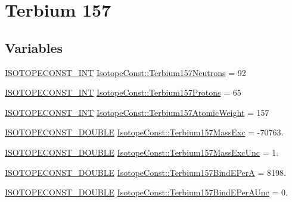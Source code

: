 \hypertarget{group___isotope_const-_terbium-_tb157}{}\section{Terbium 157}
\label{group___isotope_const-_terbium-_tb157}
\subsection*{Variables}
\begin{DoxyCompactItemize}
\item 
\mbox{\hyperlink{group___isotope_const-_macros_ga5f18360b3e99483a35c32d789e62621c}{I\+S\+O\+T\+O\+P\+E\+C\+O\+N\+S\+T\+\_\+\+I\+NT}} \mbox{\hyperlink{group___isotope_const-_terbium-_tb157_ga31b5c0f8ba5db8fcda352d6340b4ae1a}{Isotope\+Const\+::\+Terbium157\+Neutrons}} = 92
\item 
\mbox{\hyperlink{group___isotope_const-_macros_ga5f18360b3e99483a35c32d789e62621c}{I\+S\+O\+T\+O\+P\+E\+C\+O\+N\+S\+T\+\_\+\+I\+NT}} \mbox{\hyperlink{group___isotope_const-_terbium-_tb157_gaecf9312bb1c00d11797f0d87881f6bab}{Isotope\+Const\+::\+Terbium157\+Protons}} = 65
\item 
\mbox{\hyperlink{group___isotope_const-_macros_ga5f18360b3e99483a35c32d789e62621c}{I\+S\+O\+T\+O\+P\+E\+C\+O\+N\+S\+T\+\_\+\+I\+NT}} \mbox{\hyperlink{group___isotope_const-_terbium-_tb157_ga8c486169a444f071245c0b2d95e10bf5}{Isotope\+Const\+::\+Terbium157\+Atomic\+Weight}} = 157
\item 
\mbox{\hyperlink{group___isotope_const-_macros_ga8f45a7272ce02c0b4c65c44636ed719a}{I\+S\+O\+T\+O\+P\+E\+C\+O\+N\+S\+T\+\_\+\+D\+O\+U\+B\+LE}} \mbox{\hyperlink{group___isotope_const-_terbium-_tb157_ga79514ba4e310367f50025edf13e921c9}{Isotope\+Const\+::\+Terbium157\+Mass\+Exc}} = -\/70763.
\item 
\mbox{\hyperlink{group___isotope_const-_macros_ga8f45a7272ce02c0b4c65c44636ed719a}{I\+S\+O\+T\+O\+P\+E\+C\+O\+N\+S\+T\+\_\+\+D\+O\+U\+B\+LE}} \mbox{\hyperlink{group___isotope_const-_terbium-_tb157_gac8c0a73d4678da332833ce9ae5da7552}{Isotope\+Const\+::\+Terbium157\+Mass\+Exc\+Unc}} = 1.
\item 
\mbox{\hyperlink{group___isotope_const-_macros_ga8f45a7272ce02c0b4c65c44636ed719a}{I\+S\+O\+T\+O\+P\+E\+C\+O\+N\+S\+T\+\_\+\+D\+O\+U\+B\+LE}} \mbox{\hyperlink{group___isotope_const-_terbium-_tb157_ga11302817feb8cf889deb85296225d550}{Isotope\+Const\+::\+Terbium157\+Bind\+E\+PerA}} = 8198.
\item 
\mbox{\hyperlink{group___isotope_const-_macros_ga8f45a7272ce02c0b4c65c44636ed719a}{I\+S\+O\+T\+O\+P\+E\+C\+O\+N\+S\+T\+\_\+\+D\+O\+U\+B\+LE}} \mbox{\hyperlink{group___isotope_const-_terbium-_tb157_ga9bfacf45dc41263139e82102bac30fde}{Isotope\+Const\+::\+Terbium157\+Bind\+E\+Per\+A\+Unc}} = 0.

\end{DoxyCompactItemize}
